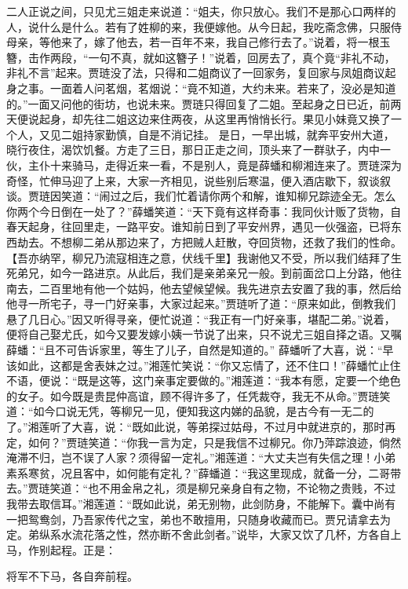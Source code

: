 \documentclass[12pt,oneside]{book}
\begin{document}
二人正说之间，只见尤三姐走来说道：“姐夫，你只放心。我们不是那心口两样的人，说什么是什么。若有了姓柳的来，我便嫁他。从今日起，我吃斋念佛，只服侍母亲，等他来了，嫁了他去，若一百年不来，我自己修行去了。”说着，将一根玉簪，击作两段，“一句不真，就如这簪子！”说着，回房去了，真个竟“非礼不动，非礼不言”起来。贾琏没了法，只得和二姐商议了一回家务，复回家与凤姐商议起身之事。一面着人问茗烟，茗烟说：“竟不知道，大约未来。若来了，没必是知道的。”一面又问他的街坊，也说未来。贾琏只得回复了二姐。至起身之日已近，前两天便说起身，却先往二姐这边来住两夜，从这里再悄悄长行。果见小妹竟又换了一个人，又见二姐持家勤慎，自是不消记挂。
是日，一早出城，就奔平安州大道，晓行夜住，渴饮饥餐。方走了三日，那日正走之间，顶头来了一群驮子，内中一伙，主仆十来骑马，走得近来一看，不是别人，竟是薛蟠和柳湘连来了。贾琏深为奇怪，忙伸马迎了上来，大家一齐相见，说些别后寒温，便入酒店歇下，叙谈叙谈。贾琏因笑道：“闹过之后，我们忙着请你两个和解，谁知柳兄踪迹全无。怎么你两个今日倒在一处了？”薛蟠笑道：“天下竟有这样奇事：我同伙计贩了货物，自春天起身，往回里走，一路平安。谁知前日到了平安州界，遇见一伙强盗，已将东西劫去。不想柳二弟从那边来了，方把贼人赶散，夺回货物，还救了我们的性命。【吾亦纳罕，柳兄乃流寇相连之意，伏线千里】我谢他又不受，所以我们结拜了生死弟兄，如今一路进京。从此后，我们是亲弟亲兄一般。到前面岔口上分路，他往南去，二百里地有他一个姑妈，他去望候望候。我先进京去安置了我的事，然后给他寻一所宅子，寻一门好亲事，大家过起来。”贾琏听了道：“原来如此，倒教我们悬了几日心。”因又听得寻亲，便忙说道：“我正有一门好亲事，堪配二弟。”说着，便将自己娶尤氏，如今又要发嫁小姨一节说了出来，只不说尤三姐自择之语。又嘱薛蟠：“且不可告诉家里，等生了儿子，自然是知道的。”
薛蟠听了大喜，说：“早该如此，这都是舍表妹之过。”湘莲忙笑说：“你又忘情了，还不住口！”薛蟠忙止住不语，便说：“既是这等，这门亲事定要做的。”湘莲道：“我本有愿，定要一个绝色的女子。如今既是贵昆仲高谊，顾不得许多了，任凭裁夺，我无不从命。”贾琏笑道：“如今口说无凭，等柳兄一见，便知我这内娣的品貌，是古今有一无二的了。”湘莲听了大喜，说：“既如此说，等弟探过姑母，不过月中就进京的，那时再定，如何？”贾琏笑道：“你我一言为定，只是我信不过柳兄。你乃萍踪浪迹，倘然淹滞不归，岂不误了人家？须得留一定礼。”湘莲道：“大丈夫岂有失信之理！小弟素系寒贫，况且客中，如何能有定礼？”薛蟠道：“我这里现成，就备一分，二哥带去。”贾琏笑道：“也不用金帛之礼，须是柳兄亲身自有之物，不论物之贵贱，不过我带去取信耳。”湘莲道：“既如此说，弟无别物，此剑防身，不能解下。囊中尚有一把鸳鸯剑，乃吾家传代之宝，弟也不敢擅用，只随身收藏而已。贾兄请拿去为定。弟纵系水流花落之性，然亦断不舍此剑者。”说毕，大家又饮了几杯，方各自上马，作别起程。正是：

将军不下马，各自奔前程。
\end{document}
